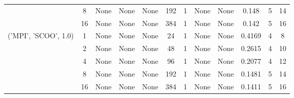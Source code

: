 \begin{tabular}{cccccccccccc}
& 8& None& None& None& 192& 1& None& None& 0.148& 5& 14\\
& 16& None& None& None& 384& 1& None& None& 0.142& 5& 16\\
\hline
\multirow{5}{*}{('MPI', 'SCOO', 1.0)}& 1& None& None& None& 24& 1& None& None& 0.4169& 4& 8\\
& 2& None& None& None& 48& 1& None& None& 0.2615& 4& 10\\
& 4& None& None& None& 96& 1& None& None& 0.2077& 4& 12\\
& 8& None& None& None& 192& 1& None& None& 0.1481& 5& 14\\
& 16& None& None& None& 384& 1& None& None& 0.1411& 5& 16\\
\hline
\end{tabular}



